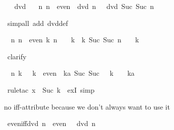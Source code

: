 \begin{isabellebody}
\begin{isamarkuptxt}
\begin{isabelle}%
\ {}{\isachardot}\ {\isacharhash}{}\ dvd\ {}\isanewline
\ {}{\isachardot}\ {\isasymAnd}n{\isachardot}\ {\isasymlbrakk}n\ {\isasymin}\ even{\isacharsemicolon}\ {\isacharhash}{}\ dvd\ n{\isasymrbrakk}\ {\isasymLongrightarrow}\ {\isacharhash}{}\ dvd\ Suc\ {\isacharparenleft}Suc\ n{\isacharparenright}%
\end{isabelle}%
\end{isamarkuptxt}%
\ {\isacharparenleft}simp{\isacharunderscore}all\ add{\isacharcolon}\ dvd{\isacharunderscore}def{\isacharparenright}%
\begin{isamarkuptxt}%
\begin{isabelle}%
\ {}{\isachardot}\ {\isasymAnd}n{\isachardot}\ {\isasymlbrakk}n\ {\isasymin}\ even{\isacharsemicolon}\ {\isasymexists}k{\isachardot}\ n\ {\isacharequal}\ {\isacharhash}{}\ {\isacharasterisk}\ k{\isasymrbrakk}\ {\isasymLongrightarrow}\ {\isasymexists}k{\isachardot}\ Suc\ {\isacharparenleft}Suc\ n{\isacharparenright}\ {\isacharequal}\ {\isacharhash}{}\ {\isacharasterisk}\ k%
\end{isabelle}%
\end{isamarkuptxt}%
\ clarify%
\begin{isamarkuptxt}%
\begin{isabelle}%
\ {}{\isachardot}\ {\isasymAnd}n\ k{\isachardot}\ {\isacharhash}{}\ {\isacharasterisk}\ k\ {\isasymin}\ even\ {\isasymLongrightarrow}\ {\isasymexists}ka{\isachardot}\ Suc\ {\isacharparenleft}Suc\ {\isacharparenleft}{\isacharhash}{}\ {\isacharasterisk}\ k{\isacharparenright}{\isacharparenright}\ {\isacharequal}\ {\isacharhash}{}\ {\isacharasterisk}\ ka%
\end{isabelle}%
\end{isamarkuptxt}%
\ {\isacharparenleft}rule{\isacharunderscore}tac\ x\ {\isacharequal}\ {\isachardoublequote}Suc\ k{\isachardoublequote}\ \ exI{\isacharcomma}\ simp{\isacharparenright}\isanewline
{}%
\begin{isamarkuptext}%
no iff-attribute because we don't always want to use it%
\end{isamarkuptext}%
\ even{\isacharunderscore}iff{\isacharunderscore}dvd{\isacharcolon}\ {\isachardoublequote}{\isacharparenleft}n\ {\isasymin}\ even{\isacharparenright}\ {\isacharequal}\ {\isacharparenleft}{\isacharhash}{}\ dvd\ n{\isacharparenright}{\isachardoublequote}\isanewline

\end{isabellebody}
